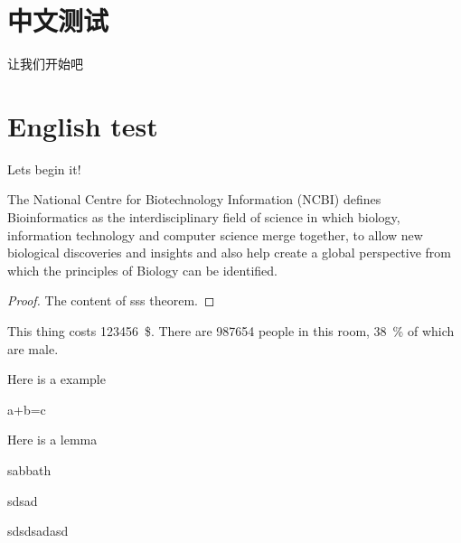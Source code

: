 \documentclass[]{subook}
\begin{document}
\section{中文测试}
让我们开始吧~ 
\zhlipsum[1-3]

\section{English test}

Lets begin it!
\lipsum[1-2]


The National Centre for Biotechnology Information (NCBI)   defines Bioinformatics as the interdisciplinary field of science in which biology, information technology and computer science merge together, to allow new biological discoveries and insights and also help create a global perspective from which the principles of Biology can be identified. 
\begin{proof}
    The content of sss theorem.
\end{proof}
This thing costs \SI{123456}{\$}.
There are \num{987654} people in this room, \SI{38}{\percent} of which are male.


Here is a example
\begin{example}
    a+b=c
\end{example}



Here is a lemma
\begin{lemma}
    sabbath
\end{lemma}


\begin{definition}[definition]
    sdsad
\end{definition}

\begin{fullpage}


\end{fullpage}








  sdsdsadasd\citep{li2022limb}



\end{document}
